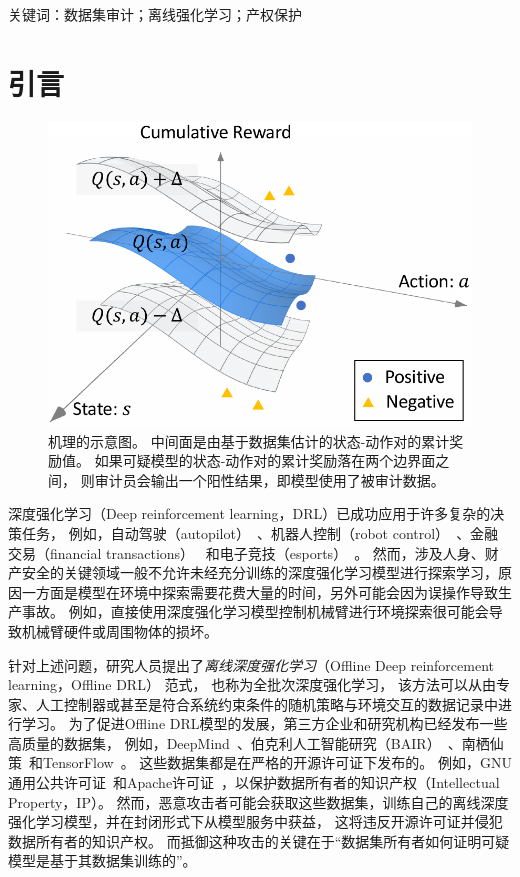 关键词：数据集审计；离线强化学习；产权保护

\section{引言}
\label{sec:intro}
\begin{figure}[!t]
    \centering
    \includegraphics[width=0.5\hsize]{figure/orl_auditor/intuition-v1.pdf}
    \caption{
    \sysnameo 机理的示意图。
    中间面是由基于数据集估计的状态-动作对的累计奖励值。
    如果可疑模型的状态-动作对的累计奖励落在两个边界面之间，
    则审计员会输出一个阳性结果，即模型使用了被审计数据。}
    \label{fig:intuition}
\end{figure}

深度强化学习（Deep reinforcement learning，DRL）已成功应用于许多复杂的决策任务，
例如，自动驾驶（autopilot）~\cite{FHOL18}、机器人控制（robot control）~\cite{A17}、金融交易（financial transactions）~\cite{DBKRD17} 和电子竞技（esports）~\cite{SSSAHGHBLB17,BBCCDDFFHHJGOPPPRSSSSSTWZ19}。
然而，涉及人身、财产安全的关键领域一般不允许未经充分训练的深度强化学习模型进行探索学习，原因一方面是模型在环境中探索需要花费大量的时间，另外可能会因为误操作导致生产事故。
例如，直接使用深度强化学习模型控制机械臂进行环境探索很可能会导致机械臂硬件或周围物体的损坏。

针对上述问题，研究人员提出了\textit{离线深度强化学习}（Offline Deep reinforcement learning，Offline DRL）\cite{DBLP:journals/corr/abs-2005-01643} 范式，
也称为全批次深度强化学习\cite{DBLP:books/sp/12/LangeGR12}，
该方法可以从由专家、人工控制器或甚至是符合系统约束条件的随机策略与环境交互的数据记录中进行学习。
为了促进Offline DRL模型的发展，第三方企业和研究机构已经发布一些高质量的数据集，
例如，DeepMind~\cite{DBLP:journals/corr/abs-2006-13888}、伯克利人工智能研究（BAIR）~\cite{DBLP:journals/corr/abs-2004-07219}、南栖仙策~\cite{DBLP:journals/corr/abs-2102-00714}和TensorFlow~\cite{tensorflow2015-whitepaper}。
这些数据集都是在严格的开源许可证下发布的。
例如，GNU通用公共许可证~\cite{DBLP:journals/corr/BeattieLTWWKLGV16}和Apache许可证~\cite{DBLP:journals/corr/abs-2006-13888, DBLP:journals/corr/abs-2004-07219, tensorflow2015-whitepaper}，以保护数据所有者的知识产权（Intellectual Property，IP）。
然而，恶意攻击者可能会获取这些数据集，训练自己的离线深度强化学习模型，并在封闭形式下从模型服务中获益，
这将违反开源许可证并侵犯数据所有者的知识产权。
而抵御这种攻击的关键在于“数据集所有者如何证明可疑模型是基于其数据集训练的”。

